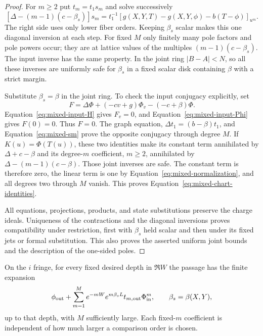 \begin{proof}
For $m\geq2$ put $t_m=t_1s_m$ and solve successively
\begin{equation}\label{eq:mixed-sm}
 [\Delta-(m-1)(c-\beta_s)]s_m
  =t_1^{-1}[g(X,Y,T)-g(X,Y,\phi)-b(T-\phi)]_{u^m}.
\end{equation}
The right side uses only lower fiber orders. Keeping $\beta_s$
scalar makes this one diagonal inversion at each step. For fixed
$M$ only finitely many pole factors and pole powers occur; they
are at lattice values of the multiples $(m-1)(c-\beta_s)$.
The input inverse has the same property. In the joint ring
$|B-A|<N$, so all these inverses are uniformly safe for $\beta_s$
in a fixed scalar disk containing $\beta$ with a strict margin.

Substitute $\beta_s=\beta$ in the joint ring. To check the input
conjugacy explicitly, set
\[
 F=\Delta\Phi+(-cv+g)\Phi_v-(-c+\beta)\Phi.
\]
Equation~\eqref{eq:mixed-input-H} gives $F_v=0$, and
Equation~\eqref{eq:mixed-input-Phi} gives $F(0)=0$. Thus $F=0$.
The graph equation, $\Delta t_1=(b-\beta)t_1$, and
Equation~\eqref{eq:mixed-sm} prove the opposite conjugacy through
degree $M$. If $K(u)=\Phi(T(u))$, these two identities make its
constant term annihilated by $\Delta+c-\beta$ and its degree-$m$
coefficient, $m\geq2$, annihilated by
$\Delta-(m-1)(c-\beta)$. Those joint inverses are safe. The
constant term is therefore zero, the linear term is one by
Equation~\eqref{eq:mixed-normalization}, and all degrees two
through $M$ vanish. This proves
Equation~\eqref{eq:mixed-chart-identities}.

All equations, projections, products, and state substitutions
preserve the charge ideals. Uniqueness of the contractions and
the diagonal inversions proves compatibility under restriction,
first with $\beta_s$ held scalar and then under its fixed jets or
formal substitution. This also proves the asserted uniform joint
bounds and the description of the one-sided poles.
\end{proof}

\begin{lemma}\label{lem:mixed-fast-transition}
On the $i$ fringe, for every fixed desired depth in $\Re W$ the
passage has the finite expansion
\begin{equation}\label{eq:mixed-fast-expansion}
 \phi_{\rm out}+\sum_{m=1}^{M}
 e^{-mW}e^{m\beta_sL}t_{m,\rm out}\Phi_{\rm in}^{m},
 \qquad \beta_s=\beta(X,Y),
\end{equation}
up to that depth, with $M$ sufficiently large. Each fixed-$m$
coefficient is independent of how much larger a comparison order
is chosen.
\end{lemma}

